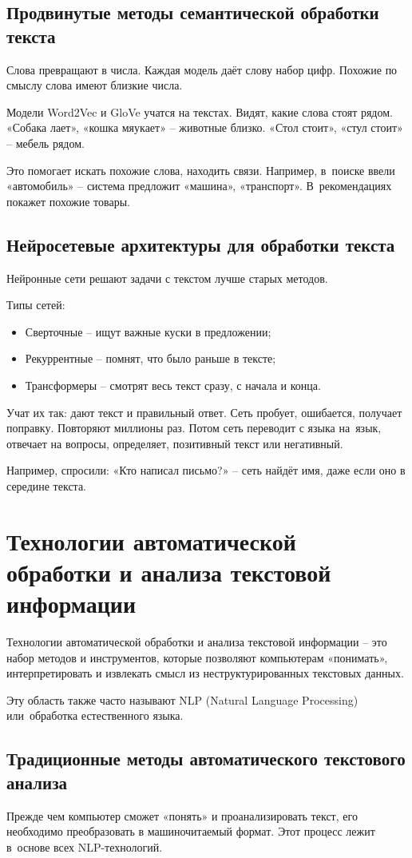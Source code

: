 \documentclass{ou}
\begin{document}
\subsection{Продвинутые методы семантической обработки текста}
Слова превращают в числа. Каждая модель даёт слову набор цифр. Похожие по смыслу слова имеют близкие числа.

Модели Word2Vec и GloVe учатся на текстах. Видят, какие слова стоят рядом. «Собака лает», «кошка мяукает» -- животные близко. «Стол стоит», «стул стоит» -- мебель рядом.

Это помогает искать похожие слова, находить связи. Например, в~поиске ввели «автомобиль» -- система предложит «машина», «транспорт». В~рекомендациях покажет похожие товары.
\subsection{Нейросетевые архитектуры для обработки текста}
Нейронные сети решают задачи с текстом лучше старых методов.

Типы сетей:
\begin{itemize}[label=-, leftmargin=0em, itemindent=3.35em, nosep]
\item Сверточные -- ищут важные куски в предложении;
\item Рекуррентные -- помнят, что было раньше в тексте;
\item Трансформеры -- смотрят весь текст сразу, с начала и конца.
\end{itemize}

Учат их так: дают текст и правильный ответ. Сеть пробует, ошибается, получает поправку. Повторяют миллионы раз. Потом сеть переводит с языка на~язык, отвечает на вопросы, определяет, позитивный текст или негативный.

Например, спросили: «Кто написал письмо?» -- сеть найдёт имя, даже если оно в середине текста.
\newpage
\section{Технологии автоматической обработки и анализа текстовой информации}
Технологии автоматической обработки и анализа текстовой информации -- это набор методов и инструментов, которые позволяют компьютерам «понимать», интерпретировать и извлекать смысл из неструктурированных текстовых данных.

Эту область также часто называют NLP (Natural Language Processing) или~обработка естественного языка.
\subsection{Традиционные методы автоматического текстового анализа}
Прежде чем компьютер сможет «понять» и проанализировать текст, его необходимо преобразовать в машиночитаемый формат. Этот процесс лежит в~основе всех NLP-технологий.
\end{document}
